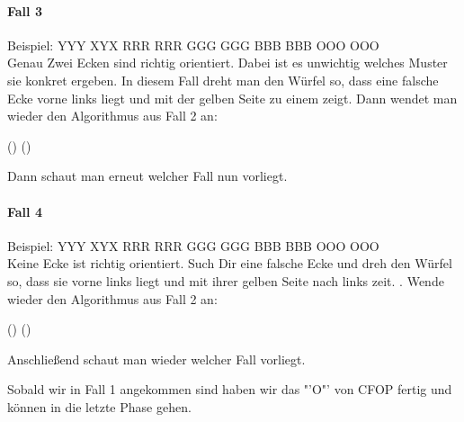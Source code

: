 \pagebreak
\paragraph{Fall 3}
Beispiel:
\RubikCubeGreyAll%
            {Y}{Y}{Y}
            {X}{Y}{X}%
               {R}{R}{R}
	       {R}{R}{R}%
	       {G}{G}{G}
	       {G}{G}{G}%
	      {B}{B}{B}
	      {B}{B}{B}%
	      {O}{O}{O}
	      {O}{O}{O}%
\\[1em]
Genau Zwei Ecken sind richtig orientiert. Dabei ist es unwichtig welches Muster sie konkret ergeben.
In diesem Fall dreht man den Würfel so, dass eine falsche Ecke vorne links liegt und mit
der gelben Seite zu einem zeigt. Dann wendet man wieder den Algorithmus aus Fall 2 an:
\begin{center}
	\sffamily\Large () ()
\end{center}
Dann schaut man erneut welcher Fall nun vorliegt.

\paragraph{Fall 4}
Beispiel:
\RubikCubeGreyAll%
            {Y}{Y}{Y}
            {X}{Y}{X}%
               {R}{R}{R}
	       {R}{R}{R}%
	       {G}{G}{G}
	       {G}{G}{G}%
	      {B}{B}{B}
	      {B}{B}{B}%
	      {O}{O}{O}
	      {O}{O}{O}%
\\[1em]
Keine Ecke ist richtig orientiert. Such Dir eine falsche Ecke und dreh den Würfel so,
dass sie vorne links liegt und mit ihrer gelben Seite nach links zeit. .
Wende wieder den Algorithmus aus Fall 2 an:
\begin{center}
	\sffamily\Large () ()
\end{center}
Anschließend schaut man wieder welcher Fall vorliegt.

Sobald wir in Fall 1 angekommen sind haben wir das "'O"' von CFOP fertig und
können in die letzte Phase gehen.
